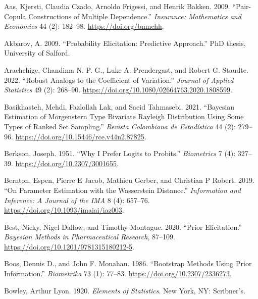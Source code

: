 \documentclass[
]{interact}
\newlength{\cslhangindent}
\newenvironment{CSLReferences}[2] %
 {\begin{list}{}{%
  \setlength{\itemindent}{0pt}
  \setlength{\leftmargin}{0pt}
  \setlength{\parsep}{0pt}
  \ifodd #1
   \setlength{\leftmargin}{\cslhangindent}
   \setlength{\itemindent}{-1\cslhangindent}
  \fi
  \setlength{\itemsep}{#2\baselineskip}}}
 {\end{list}}
\begin{document}
\label{refs}
\begin{CSLReferences}{1}{0}
Aas, Kjersti, Claudia Czado, Arnoldo Frigessi, and Henrik Bakken. 2009.
{``Pair-Copula Constructions of Multiple Dependence.''} \emph{Insurance:
Mathematics and Economics} 44 (2): 182--98.
\url{https://doi.org/bmnchh}.

Akbarov, A. 2009. {``Probability Elicitation: {Predictive} Approach.''}
PhD thesis, University of Salford.

Arachchige, Chandima N. P. G., Luke A. Prendergast, and Robert G.
Staudte. 2022. {``Robust Analogs to the Coefficient of Variation.''}
\emph{Journal of Applied Statistics} 49 (2): 268--90.
\url{https://doi.org/10.1080/02664763.2020.1808599}.

Basikhasteh, Mehdi, Fazlollah Lak, and Saeid Tahmasebi. 2021.
{``Bayesian {Estimation} of {Morgenstern Type Bivariate Rayleigh
Distribution Using Some Types} of {Ranked Set Sampling}.''}
\emph{Revista Colombiana de Estad{í}stica} 44 (2): 279--96.
\url{https://doi.org/10.15446/rce.v44n2.87825}.

Berkson, Joseph. 1951. {``Why {I Prefer Logits} to {Probits}.''}
\emph{Biometrics} 7 (4): 327--39. \url{https://doi.org/10.2307/3001655}.

Bernton, Espen, Pierre E Jacob, Mathieu Gerber, and Christian P Robert.
2019. {``On Parameter Estimation with the {Wasserstein} Distance.''}
\emph{Information and Inference: A Journal of the IMA} 8 (4): 657--76.
\url{https://doi.org/10.1093/imaiai/iaz003}.

Best, Nicky, Nigel Dallow, and Timothy Montague. 2020. {``Prior
Elicitation.''} \emph{Bayesian Methods in Pharmaceutical Research},
87--109. \url{https://doi.org/10.1201/9781315180212-5}.

Boos, Dennis D., and John F. Monahan. 1986. {``Bootstrap {Methods Using
Prior Information}.''} \emph{Biometrika} 73 (1): 77--83.
\url{https://doi.org/10.2307/2336273}.

Bowley, Arthur Lyon. 1920. \emph{Elements of Statistics}. New York, NY:
Scribner's.


\end{CSLReferences}
\end{document}
